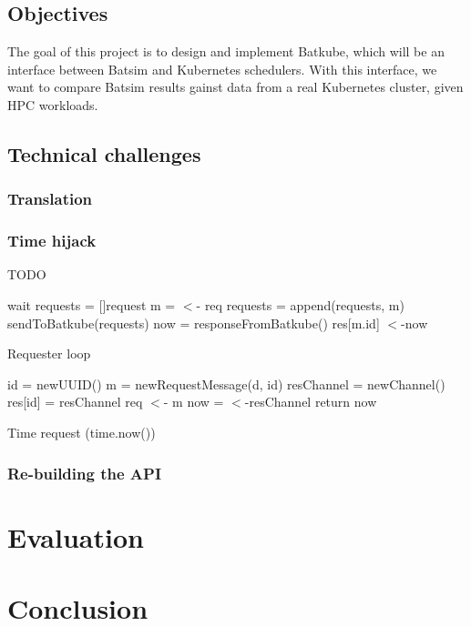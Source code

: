 \documentclass[12pt, a4paper]{memoir}
\begin{document}
\section{Objectives}

The goal of this project is to design and implement Batkube, which will be an
interface between Batsim and Kubernetes schedulers. With this interface, we
want to compare Batsim results gainst data from a real Kubernetes cluster,
given HPC workloads.

\section{Technical challenges}
\subsection{Translation}
\subsection{Time hijack}
TODO



\begin{algorithm}[H]
\DontPrintSemicolon
{}
 {
	wait\;
}
requests = []request\;
 {
	m = $<$- req 
	requests = append(requests, m)\;
}
sendToBatkube(requests) 
now = responseFromBatkube()\;
 {
	res[m.id] $<$-now 
}

	
\caption{Requester loop}
\label{alg:reqLoop}
\end{algorithm}


\begin{algorithm}[H]
\DontPrintSemicolon
{}

id = newUUID()\;
m = newRequestMessage(d, id) 
resChannel = newChannel()\;
res[id] = resChannel 
req $<$- m 
now = $<$-resChannel 
return now\;
\caption{Time request (time.now())}
\label{alg:now}
\end{algorithm}

\subsection{Re-building the API}

\chapter{Evaluation}

\chapter{Conclusion}


\backmatter
\printbibliography
\end{document}
